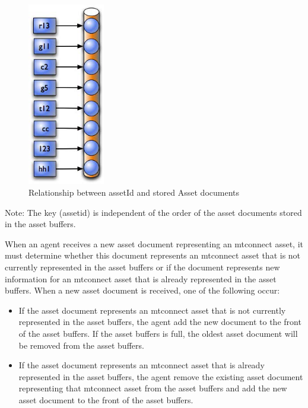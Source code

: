 \begin{figure}[ht]
  \centering
  \includegraphics[width=0.3\textwidth]{figures/relationship-between-assetid-and-stored-asset-documents.png}
  \caption{Relationship between assetId and stored Asset documents}
  \label{fig:relationship-between-assetid-and-stored-asset-documents}
\end{figure}

\FloatBarrier

\begin{note}
Note:  The key (\gls{assetid}) is independent of the order of the \glspl{asset document} stored in the \glspl{asset buffer}.

\end{note}

When an \gls{agent} receives a new \gls{asset document} representing an \gls{mtconnect asset}, it must determine whether this document represents an \gls{mtconnect asset} that is not currently represented in the \glspl{asset buffer} or if the document represents new information for an \gls{mtconnect asset} that is already represented in the \glspl{asset buffer}.  When a new \gls{asset document} is received, one of the following \MUST occur:

\begin{itemize}

\item If the \gls{asset document} represents an \gls{mtconnect asset} that is not currently represented in the \glspl{asset buffer}, the \gls{agent} \MUST add the new document to the front of the \glspl{asset buffer}.  If the \glspl{asset buffer} is full, the oldest \gls{asset document} will be removed from the \glspl{asset buffer}.

\item If the \gls{asset document} represents an \gls{mtconnect asset} that is already represented in the \glspl{asset buffer}, the \gls{agent} \MUST remove the existing \gls{asset document} representing that \gls{mtconnect asset} from the \glspl{asset buffer} and add the new \gls{asset document} to the front of the \glspl{asset buffer}.  

\end{itemize}

